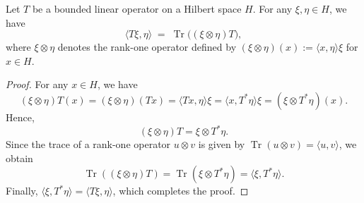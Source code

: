 \documentclass[12pt]{amsart}
\begin{document}
\begin{lemma}\label{traceequality}
Let $T$ be a bounded linear operator on a Hilbert space $H$.
For any $\xi,\eta\in H$, we have
\[
\langle T\xi, \eta\rangle \;=\; \operatorname{Tr}\big((\xi\otimes \eta)T\big),
\]
where $\xi\otimes \eta$ denotes the rank-one operator defined by
\((\xi\otimes \eta)(x) := \langle x,\eta\rangle \xi\) for $x\in H$.
\end{lemma}

\begin{proof}
For any $x\in H$, we have
\[
(\xi\otimes \eta)T(x) = (\xi\otimes \eta)(Tx) = \langle Tx, \eta\rangle \xi=\langle x, T^*\eta\rangle \xi=(\xi\otimes T^*\eta)(x).
\]
Hence,
\[
(\xi\otimes \eta)T = \xi\otimes T^*\eta.
\]
Since the trace of a rank-one operator $u\otimes v$ is given by
\(\operatorname{Tr}(u\otimes v) = \langle u, v\rangle\), we obtain
\[
\operatorname{Tr}((\xi\otimes \eta)T) = \operatorname{Tr}(\xi\otimes T^*\eta) = \langle \xi, T^*\eta\rangle.
\]
Finally, $\langle \xi, T^*\eta\rangle = \langle T\xi, \eta\rangle$, which completes the proof.
\end{proof}
\end{document}
